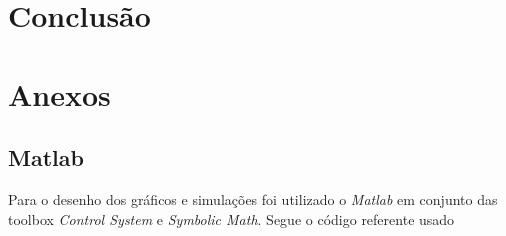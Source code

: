 \documentclass[a4paper,11pt]{article}
\begin{document}
\section{Conclusão}


\newpage

\nocite{sympy}
\nocite{pythontex}
\nocite{matlabcontrol}
\nocite{matlabsymbolic}

\newpage
\section*{Anexos}



\newpage
\subsection*{Matlab}

Para o desenho dos gráficos e simulações foi utilizado o \textit{Matlab} em conjunto das toolbox \textit{Control System}\cite{matlabcontrol} e \textit{Symbolic Math}\cite{matlabsymbolic}. Segue o código referente usado

\inputminted[xleftmargin=15pt,linenos,frame=single,framesep=5pt,breaklines=true]{matlab}{../matlab/exsim4/exsim4.m}




\end{document}
